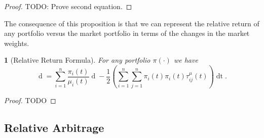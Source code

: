 \documentclass[british]{amsart} \usepackage{lmodern}
\numberwithin{equation}{section} \numberwithin{figure}{section}
\theoremstyle{plain} \newtheorem{thm}{\protect\theoremname}[section]
\theoremstyle{definition} \newtheorem{defn}[thm]{\protect\definitionname}
\theoremstyle{plain} \newtheorem{assumption}[thm]{\protect\assumptionname}
\theoremstyle{plain} \newtheorem{lem}[thm]{\protect\lemmaname}
\theoremstyle{plain} \newtheorem{prop}[thm]{\protect\propositionname}
\theoremstyle{remark} \newtheorem{rem}[thm]{\protect\remarkname}
\theoremstyle{plain} \newtheorem{cor}[thm]{\protect\corollaryname}
\renewcommand{\d}[1]{\mathop{\mathrm{d}{#1}}}
\newcommand{\defeq}{\mathop{\triangleq}} \newcommand{\almostsurely}{\text{a.s.}}
\begin{document}
\begin{proof}
TODO: Prove second equation.
%
%
%
%
%
%
%

\end{proof}

The consequence of this proposition is that we can represent the relative 
return of any portfolio versus the market portfolio in terms of the changes 
in the market weights.

\begin{thm} [Relative Return Formula] For any portfolio $\pi(\cdot)$ we have
  \begin{equation*} 
    \d{ \log{ \left( \frac{ V^{\pi}(t) }{ V^{\mu}(t) } \right) }} = 
    \sum_{i=1}^{n} \frac{\pi_{i}(t)}{\mu_{i}(t)} \d{\mu_{i}(t)} - 
    \frac{1}{2} \left( 
        \sum_{i=1}^{n} \sum_{j=1}^{n} \pi_{i}(t) \pi_{i}(t) \tau_{ij}^{\mu}(t)
    \right) \d{t}. 
  \end{equation*} 
\end{thm}

\begin{proof} 
  TODO
\end{proof}

\subsection{Relative Arbitrage}
\end{document}
